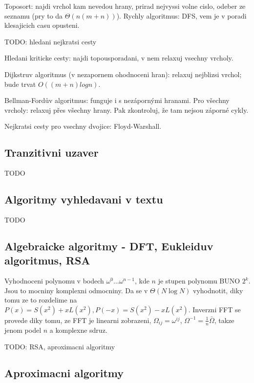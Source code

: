 Toposort: najdi vrchol kam nevedou hrany, prirad nejvyssi volne cislo, odeber
ze seznamu (pry to da $\Theta(n(m+n))$).
Rychly algoritmus: DFS, vem je v poradi klesajicich casu opusteni.

TODO: hledani nejkratsi cesty

Hledani kriticke cesty: najdi topousporadani, v nem relaxuj vsechny vrcholy.

Dijkstruv algoritmus (v nezapornem ohodnoceni hran):
relaxuj nejblizsi vrchol; bude trvat $O((m+n) log n)$.

Bellman-Fordův algoritmus: funguje i s nezápornými hranami.
Pro všechny vrcholy: relaxuj přes všechny hrany.
Pak zkontroluj, že tam nejsou záporné cykly.

Nejkratsi cesty pro vsechny dvojice: Floyd-Warshall. 

\subsection{Tranzitivni uzaver}
TODO

\subsection{Algoritmy vyhledavani v textu}
TODO

\subsection{Algebraicke algoritmy - DFT, Eukleiduv algoritmus, RSA}

Vyhodnoceni polynomu v bodech $\omega^0\ldots\omega^{n-1}$, kde
$n$ je stupen polynomu BUNO $2^k$. Jsou to mocniny komplexni odmocniny.
Da se v $\Theta(N\log N)$ vyhodnotit, diky tomu ze to rozdelime na
$P(x)=S(x^2)+xL(x^2), P(-x)=S(x^2)-xL(x^2)$. Inverzni FFT se provede
diky tomu, ze FFT je linearni zobrazeni, $\Omega_{ij}=\omega^{ij}$,
$\Omega^{-1}=\frac{1}{n}\bar{\Omega}$, takze jenom podel $n$ a komplexne sdruz.

TODO: RSA, aproximacni algoritmy

\subsection{Aproximacni algoritmy}
